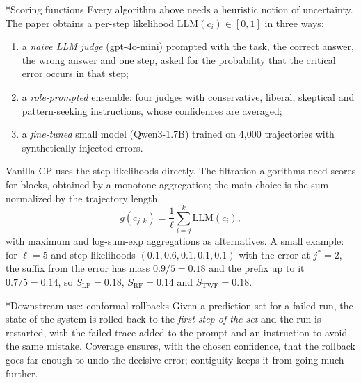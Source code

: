 \documentclass[11pt]{article}
\makeatletter
\theoremstyle{definition}
\renewcommand\subsection{\@startsection{subsection}{2}{\z@}{-3.25ex\@plus -1ex \@minus -.2ex}{1.5ex \@plus .2ex}{\normalfont\large\bfseries\color{secblue}}}
\newcommand{\LF}{\mathrm{LF}}
\newcommand{\RF}{\mathrm{RF}}
\newcommand{\TWF}{\mathrm{TWF}}
\newcommand{\jstar}{j^*}
\makeatother
\begin{document}
\subsection*{Scoring functions}
Every algorithm above needs a heuristic notion of uncertainty. The paper obtains a per-step likelihood $\mathrm{LLM}(c_i)\in[0,1]$ in three ways:
\begin{enumerate}[leftmargin=1.8em]
\item a \emph{naive LLM judge} (gpt-4o-mini) prompted with the task, the correct answer, the wrong answer and one step, asked for the probability that the critical error occurs in that step;
\item a \emph{role-prompted} ensemble: four judges with conservative, liberal, skeptical and pattern-seeking instructions, whose confidences are averaged;
\item a \emph{fine-tuned} small model (Qwen3-1.7B) trained on 4{,}000 trajectories with synthetically injected errors.
\end{enumerate}
Vanilla CP uses the step likelihoods directly. The filtration algorithms need scores for blocks, obtained by a monotone aggregation; the main choice is the sum normalized by the trajectory length,
\begin{equation}\label{eq:sumscore}
g(c_{j:k})=\frac{1}{\ell}\sum_{i=j}^{k}\mathrm{LLM}(c_i),
\end{equation}
with maximum and log-sum-exp aggregations as alternatives. A small example: for $\ell=5$ and step likelihoods $(0.1,0.6,0.1,0.1,0.1)$ with the error at $\jstar=2$, the suffix from the error has mass $0.9/5=0.18$ and the prefix up to it $0.7/5=0.14$, so $S_\LF=0.18$, $S_\RF=0.14$ and $S_\TWF=0.18$.

\subsection*{Downstream use: conformal rollbacks}
Given a prediction set for a failed run, the state of the system is rolled back to the \emph{first step of the set} and the run is restarted, with the failed trace added to the prompt and an instruction to avoid the same mistake. Coverage ensures, with the chosen confidence, that the rollback goes far enough to undo the decisive error; contiguity keeps it from going much further.
\end{document}
